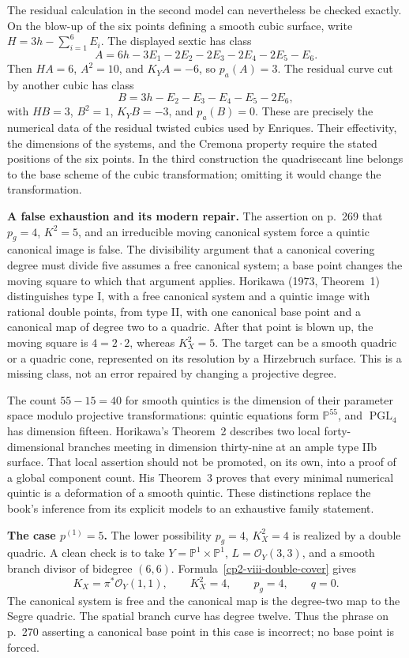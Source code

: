 The residual calculation in the second model can nevertheless be checked exactly. On the blow-up of the six points defining a smooth cubic surface, write \(H=3h-\sum_{i=1}^6E_i\). The displayed sextic has class
\[
A=6h-3E_1-2E_2-2E_3-2E_4-2E_5-E_6.
\]
Then \(HA=6\), \(A^2=10\), and \(K_YA=-6\), so \(p_a(A)=3\). The residual curve cut by another cubic has class
\[
B=3h-E_2-E_3-E_4-E_5-2E_6,
\]
with \(HB=3\), \(B^2=1\), \(K_YB=-3\), and \(p_a(B)=0\). These are precisely the numerical data of the residual twisted cubics used by Enriques. Their effectivity, the dimensions of the systems, and the Cremona property require the stated positions of the six points. In the third construction the quadrisecant line belongs to the base scheme of the cubic transformation; omitting it would change the transformation.

\textbf{A false exhaustion and its modern repair.}
The assertion on p.~269 that \(p_g=4\), \(K^2=5\), and an irreducible moving canonical system force a quintic canonical image is false. The divisibility argument that a canonical covering degree must divide five assumes a free canonical system; a base point changes the moving square to which that argument applies. Horikawa (1973, Theorem~1) distinguishes type I, with a free canonical system and a quintic image with rational double points, from type II, with one canonical base point and a canonical map of degree two to a quadric. After that point is blown up, the moving square is \(4=2\cdot2\), whereas \(K_X^2=5\). The target can be a smooth quadric or a quadric cone, represented on its resolution by a Hirzebruch surface. This is a missing class, not an error repaired by changing a projective degree.

The count \(55-15=40\) for smooth quintics is the dimension of their parameter space modulo projective transformations: quintic equations form \(\mathbb P^{55}\), and \(\operatorname{PGL}_4\) has dimension fifteen. Horikawa's Theorem~2 describes two local forty-dimensional branches meeting in dimension thirty-nine at an ample type IIb surface. That local assertion should not be promoted, on its own, into a proof of a global component count. His Theorem~3 proves that every minimal numerical quintic is a deformation of a smooth quintic. These distinctions replace the book's inference from its explicit models to an exhaustive family statement.

\textbf{The case \(p^{(1)}=5\).}
The lower possibility \(p_g=4\), \(K_X^2=4\) is realized by a double quadric. A clean check is to take \(Y=\mathbb P^1\times\mathbb P^1\), \(L=\mathcal O_Y(3,3)\), and a smooth branch divisor of bidegree \((6,6)\). Formula~\eqref{cp2-viii-double-cover} gives
\[
K_X=\pi^*\mathcal O_Y(1,1),\qquad K_X^2=4,\qquad
p_g=4,\qquad q=0.
\]
The canonical system is free and the canonical map is the degree-two map to the Segre quadric. The spatial branch curve has degree twelve. Thus the phrase on p.~270 asserting a canonical base point in this case is incorrect; no base point is forced.

